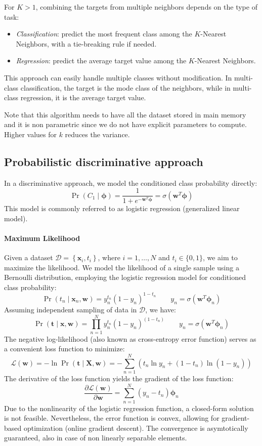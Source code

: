 For $K > 1$, combining the targets from multiple neighbors depends on the type of task:
\begin{itemize}
    \item \textit{Classification}: predict the most frequent class among the $K$-Nearest Neighbors, with a tie-breaking rule if needed.
    \item \textit{Regression}: predict the average target value among the $K$-Nearest Neighbors.
\end{itemize}
This approach can easily handle multiple classes without modification. 
In multi-class classification, the target is the mode class of the neighbors, while in multi-class regression, it is the average target value.

Note that this algorithm needs to have all the dataset stored in main memory and it is non parametric since we do not have explicit parameters to compute. 
Higher values for $k$ reduces the variance.

\subsection{Probabilistic discriminative approach}
In a discriminative approach, we model the conditioned class probability directly:
\[\Pr(C_1\mid \boldsymbol{\phi})=\dfrac{1}{1+e^{-\textbf{w}^T\boldsymbol{\phi}}}=\sigma(\textbf{w}^T\boldsymbol{\phi})\]
This model is commonly referred to as logistic regression (generalized linear model).

\paragraph*{Maximum Likelihood}
Given a dataset $\mathcal{D}=\left\{ \textbf{x}_i,t_i \right\}$, where $i=1,\dots,N$ and $t_i \in \{0,1\}$, we aim to maximize the likelihood.
We model the likelihood of a single sample using a Bernoulli distribution, employing the logistic regression model for conditioned class probability:
\[\Pr(t_n\mid\textbf{x}_n,\textbf{w})=y_n^{t_n}{\left( 1-y_n \right)}^{1-t_n} \qquad y_n=\sigma(\textbf{w}^T\boldsymbol{\phi}_n)\]
Assuming independent sampling of data in $\mathcal{D}$, we have:
\[\Pr(\textbf{t}\mid\textbf{x},\textbf{w})=\prod_{n=1}^N y_n^{t_n}{\left( 1-y_n \right)}^{(1-t_n)} \qquad y_n=\sigma(\textbf{w}^T\boldsymbol{\phi}_n)\]
The negative log-likelihood (also known as cross-entropy error function) serves as a convenient loss function to minimize:
\[\mathcal{L}(\textbf{w})=-\ln \Pr(\textbf{t}\mid\textbf{X},\textbf{w})=-\sum_{n=1}^N \left( t_n\ln y_n +(1-t_n) \ln (1-y_n) \right)\]
The derivative of the loss function yields the gradient of the loss function:
\[\dfrac{\partial\mathcal{L}(\textbf{w})}{\partial\mathbf{w}}=\sum_{n=1}^N\left( y_n-t_n \right) \boldsymbol{\phi}_n\]
Due to the nonlinearity of the logistic regression function, a closed-form solution is not feasible. 
Nevertheless, the error function is convex, allowing for gradient-based optimization (online gradient descent).
The convergence is asymtotically guaranteed, also in case of non linearly separable elements. 

